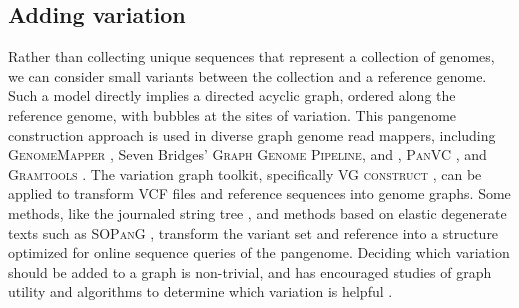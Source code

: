 
\subsection{Adding variation}

Rather than collecting unique sequences that represent a collection of genomes, we can consider small variants between the collection and a reference genome.
Such a model directly implies a directed acyclic graph, ordered along the reference genome, with bubbles at the sites of variation.
This pangenome construction approach is used in diverse graph genome read mappers, including \textsc{GenomeMapper} \cite{Schneeberger_2009}, Seven Bridges' \textsc{Graph Genome Pipeline}, and \cite{Rakocevic_2019}, \textsc{PanVC} \cite{Valenzuela_2018}, and \textsc{Gramtools} \cite{Maciuca_2016}.
The variation graph toolkit, specifically \textsc{VG construct} \cite{Garrison_2018}, can be applied to transform VCF files and reference sequences into genome graphs.
Some methods, like the journaled string tree \cite{Rahn_2014}, and methods based on elastic degenerate texts \cite{Bernardini_2019} such as \textsc{SOPanG} \cite{Cis_ak_2018}, transform the variant set and reference into a structure optimized for online sequence queries of the pangenome.
Deciding which variation should be added to a graph is non-trivial, and has encouraged studies of graph utility \cite{Novak_2017a} and algorithms to determine which variation is helpful \cite{Pritt_2018}.






